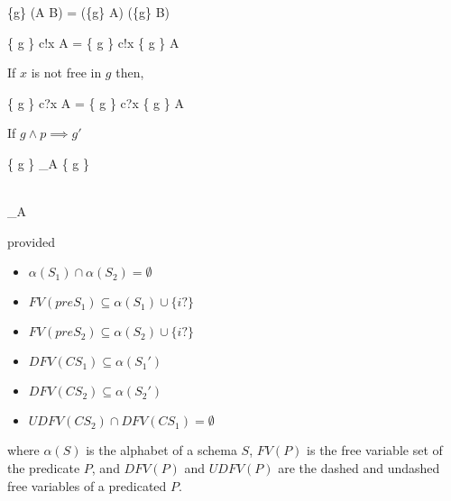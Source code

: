 \begin{law}
  \label{assump-extchoice-distr-law}
  \begin{circus}
    \{g\} \circseq (A \extchoice B)
    =
    (\{g\} \circseq A) \extchoice (\{g\} \circseq B)
  \end{circus}
\end{law}

\begin{law}
  \label{assump-output-prefix-dist-law}
  \begin{circus}
    \{ g \} \circseq c!x \then A = \{ g \} \circseq c!x \then \{ g \} \circseq A
  \end{circus}
\end{law}
  
\begin{law}
  \label{assump-input-prefix-dist-law}
  If $x$ is not free in $g$ then,
  \begin{circus}
    \{ g \} \circseq c?x \then A = \{ g \} \circseq c?x \then \{ g \} \circseq A
  \end{circus}
\end{law}

\begin{law}
  \label{assump-schema-dist-law}
  If $g \land p \implies g'$
  \begin{circus}
    \{ g \} \circseq \lschexpract [ decl | p ] \rschexpract
    \circrefines_A
    \lschexpract [ decl | p ] \rschexpract \circseq \{ g \}
  \end{circus}
\end{law}

\begin{law}
  \label{schema-seq-intro-law}
  \begin{circus}
     \\
    \circrefines_A \\
    [\Delta S_1; \Xi S_2; i? : T | preS_1 \land CS_1] 
  \end{circus}
  provided
  \begin{itemize}
  \item $\alpha(S_1) \cap \alpha(S_2) = \emptyset$
  \item $FV(preS_1) \subseteq \alpha(S_1) \cup \{i?\}$
  \item $FV(preS_2) \subseteq \alpha(S_2) \cup \{i?\}$
  \item $DFV(CS_1) \subseteq \alpha(S_1')$
  \item $DFV(CS_2) \subseteq \alpha(S_2')$
  \item $UDFV(CS_2) \cap DFV(CS_1) = \emptyset$
  \end{itemize}
  where $\alpha(S)$ is the alphabet of a schema $S$, $FV(P)$ is the
  free variable set of the predicate $P$, and $DFV(P)$ and $UDFV(P)$
  are the dashed and undashed free variables of a predicated $P$.
\end{law}

